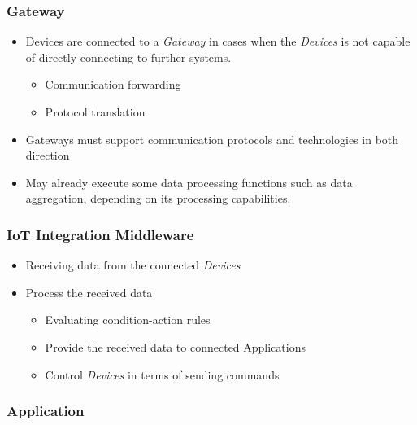 \documentclass{../iot-lecture}
\begin{document}
\begin{frame}
  \frametitle{Gateway}
  \begin{itemize}
    \item Devices are connected to a \textit{\color{Cyan} Gateway} in cases when the \textit{\color{LimeGreen} Devices} is not capable of directly connecting to further systems.
    \begin{itemize}
      \item Communication forwarding
      \item Protocol translation
    \end{itemize}
    \item Gateways must support communication protocols and technologies in both direction
    \item May already execute some data processing functions such as data aggregation, depending on its processing capabilities.
  \end{itemize}
\end{frame}

\begin{frame}
  \frametitle{IoT Integration Middleware}
  \begin{itemize}
    \item Receiving data from the connected \textit{\color{LimeGreen} Devices}
    \item Process the received data
    \begin{itemize}
      \item Evaluating condition-action rules
      \item Provide the received data to connected Applications
      \item Control \textit{\color{LimeGreen} Devices} in terms of sending commands
    \end{itemize}
  \end{itemize}
\end{frame}

\begin{frame}
  \frametitle{Application}
\end{frame}
\end{document}
